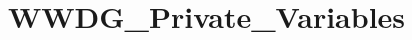 \hypertarget{group___w_w_d_g___private___variables}{\section{W\-W\-D\-G\-\_\-\-Private\-\_\-\-Variables}
\label{group___w_w_d_g___private___variables}
}
